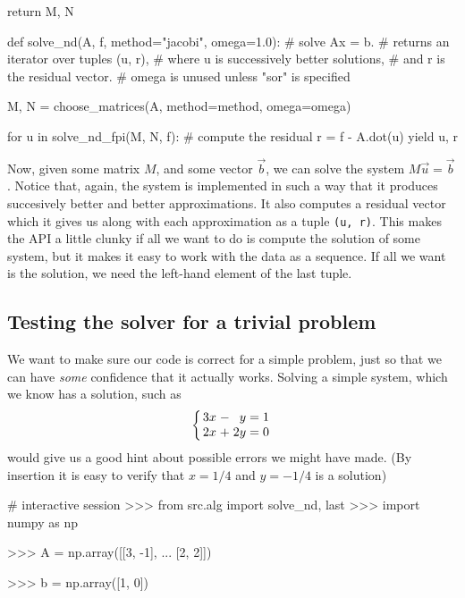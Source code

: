 \documentclass[12pt]{article}
\begin{document}
\begin{multicols}{2}
\begin{python}[
        caption={Argument-``parser'' and choice of $M$, $N$.}
    ]
    return M, N


def solve_nd(A, f, method="jacobi", omega=1.0):
    # solve Ax = b.
    # returns an iterator over tuples (u, r),
    # where u is successively better solutions,
    # and r is the residual vector.
    # omega is unused unless "sor" is specified

    M, N = choose_matrices(A,
                           method=method,
                           omega=omega)

    for u in solve_nd_fpi(M, N, f):
        # compute the residual
        r = f - A.dot(u)
        yield u, r
    \end{python}
    Now, given some matrix $M$, and some vector $\vec b$,
    we can solve the system $M\vec u = \vec b$.
    Notice that, again, the system is implemented in such a way that it
    produces succesively better and better approximations.
    It also computes a residual vector which it gives us along with
    each approximation as a tuple {\tt (u, r)}.
    This makes the API a little clunky if all we want to do is
    compute the solution of some system, but it makes it easy to
    work with the data as a sequence.
    If all we want is the solution, we need the left-hand element of
    the last tuple.

    \subsection*{Testing the solver for a trivial problem}
    We want to make sure our code is correct for a simple problem,
    just so that we can have {\em some} confidence that it actually
    works.
    Solving a simple system, which we know has a solution,
    such as
    \[
        \arraycolsep=1.4pt\def\arraystretch{1}
        \left\{\begin{array}{rcrcr}
            3x &-&  y &=&  1 \\
            2x &+& 2y &=&  0 \\
        \end{array}\right.
    \]
    would give us a good hint about possible errors we might have made.
    (By insertion it is easy to verify that $x = 1/4$ and $y = -1/4$ is a solution)
    \begin{python}
# interactive session
>>> from src.alg import solve_nd, last
>>> import numpy as np

>>> A = np.array([[3, -1],
...               [2,  2]])

>>> b = np.array([1, 0])


\end{python}
\end{multicols}
\end{document}

